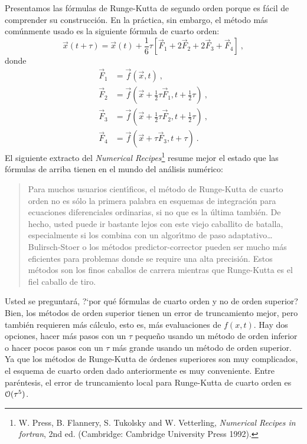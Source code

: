 Presentamos las f{\'o}rmulas de Runge-Kutta de segundo orden porque es
f{\'a}cil de comprender su construcci{\'o}n. En la pr{\'a}ctica, sin embargo, el
m{\'e}todo m{\'a}s com{\'u}nmente usado es la siguiente f{\'o}rmula de cuarto orden:
\begin{equation}
\label{c11-e3.28}
\vec x(t+\tau)=\vec x(t)+\frac 16 \tau \left [\vec F_1+2\vec F_2 + 2\vec F_3+\vec
F_4\right ]\ ,
\end{equation}
donde
\begin{equation}
\begin{split}
\label{c11-e3.29}
\vec F_1 &=\vec f(\vec x, t)\ ,\\
\vec F_2 &=\vec f\left (\vec x +\frac 12\tau \vec F_1, t+\frac 12 \tau \right)\ , \\
\vec F_3 &=\vec f\left (\vec x +\frac 12\tau \vec F_2, t+\frac 12 \tau \right)\ , \\
\vec F_4 &=\vec f(\vec x +\tau \vec F_3, t+\tau )\ .
\end{split}
\end{equation}
El siguiente extracto del {\em Numerical Recipes}\footnote{W. Press,
  B. Flannery, S. Tukolsky and W. Vetterling, {\em Numerical Recipes
    in {\sc fortran}}, 2nd ed. (Cambridge: Cambridge University Press
  1992).} resume mejor el estado que las f{\'o}rmulas de arriba tienen en
el mundo del an{\'a}lisis num{\'e}rico:
\begin{quote}
  Para muchos usuarios cient{\'\i}ficos, el m{\'e}todo de Runge-Kutta de cuarto
  orden no es s{\'o}lo la primera palabra en esquemas de integraci{\'o}n para
  ecuaciones diferenciales ordinarias, si no que es la {\'u}ltima tambi{\'e}n.
  De hecho, usted puede ir bastante lejos con este viejo caballito de
  batalla, especialmente si los combina con un algor{\'\i}tmo de paso
  adaptativo\ldots Bulirsch-Stoer o los m{\'e}todos predictor-corrector pueden
  ser mucho m{\'a}s eficientes para problemas donde se require una alta
  precisi{\'o}n.  Estos m{\'e}todos son los finos caballos de carrera mientras
  que Runge-Kutta es el fiel caballo de tiro.
\end{quote}

Usted se preguntar{\'a}, ?`por qu{\'e} f{\'o}rmulas de cuarto orden y no de orden
superior? Bien, los m{\'e}todos de orden superior tienen un error de
truncamiento mejor, pero tambi{\'e}n requieren m{\'a}s c{\'a}lculo, esto es, m{\'a}s
evaluaciones de $f(x,t)$. Hay dos opciones, hacer m{\'a}s pasos con un
$\tau$ peque{\~n}o usando un m{\'e}todo de orden inferior o hacer pocos pasos
con un $\tau$ m{\'a}s grande usando un m{\'e}todo de orden superior.  Ya que los
m{\'e}todos de Runge-Kutta de {\'o}rdenes superiores son muy complicados, el
esquema de cuarto orden dado anteriormente es muy conveniente. Entre
par{\'e}ntesis, el error de truncamiento local para Runge-Kutta de cuarto
orden es $\EuScript{O}(\tau^5)$.

